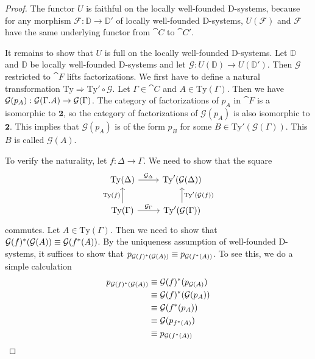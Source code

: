 \begin{proof}
The functor $U$ is faithful on the locally well-founded D-systems, because for any morphism 
$\mathcal{F}:\mathbb{D}\to\mathbb{D}'$ of locally well-founded D-systems, 
$U(\mathcal{F})$ and $\mathcal{F}$ have the same underlying functor
from $\cat{C}$ to $\cat{C}'$. 

It remains to show that $U$ is full on the locally well-founded D-systems. Let
$\mathbb{D}$ and $\mathbb{D}$ be locally well-founded D-systems and let $\mathcal{G}:U(\mathbb{D})
\to U(\mathbb{D}')$. Then $\mathcal{G}$ restricted to $\cat{F}$ lifts factorizations.
We  first have to define a natural transformation
$\mathrm{Ty}\Rightarrow \mathrm{Ty}'\circ\mathcal{G}$. Let
$\Gamma\in\cat{C}$ and $A\in\mathrm{Ty}(\Gamma)$. Then we have
$\mathcal{G}(p_A):\mathcal{G}(\ctxext{\Gamma}{A})\to \mathcal{G}(\Gamma)$.
The category of factorizations of $p_A$ in $\cat{F}$ is a isomorphic to $\mathbf{2}$,
so the category of factorizations of $\mathcal{G}(p_A)$ is also isomorphic to
$\mathbf{2}$. This implies that $\mathcal{G}(p_A)$ is of the form $p_B$ for
some $B\in\mathrm{Ty}'(\mathcal{G}(\Gamma))$. This $B$ is called $\mathcal{G}(A)$.

To verify the naturality, let $f:\Delta\to\Gamma$. We need to show that the
square
\begin{equation*}
\begin{tikzcd}
\mathrm{Ty}(\Delta) \arrow[r,"{\mathcal{G}_\Delta}"] & \mathrm{Ty}'(\mathcal{G}(\Delta)) \\
\mathrm{Ty}(\Gamma) \arrow[u,"\mathrm{Ty}(f)"] \arrow[r,"{\mathcal{G}_\Gamma}"] &
\mathrm{Ty}'(\mathcal{G}(\Gamma)) \arrow[u,swap,"{\mathrm{Ty}'(\mathcal{G}(f))}"]
\end{tikzcd}
\end{equation*}
commutes. Let $A\in\mathrm{Ty}(\Gamma)$. Then we need to show that
$\mathcal{G}(f)^\ast(\mathcal{G}(A))\equiv \mathcal{G}(f^\ast(A))$. By the uniqueness
assumption of well-founded D-systems, it suffices to show that
$p_{\mathcal{G}(f)^\ast(\mathcal{G}(A))}\equiv p_{\mathcal{G}(f^\ast(A))}$. To
see this, we do a simple calculation
\begin{align*}
p_{\mathcal{G}(f)^\ast(\mathcal{G}(A))}
& \equiv \mathcal{G}(f)^\ast(p_{\mathcal{G}(A)}) \\
& \equiv \mathcal{G}(f)^\ast(\mathcal{G}(p_A)) \\
& \equiv \mathcal{G}(f^\ast(p_A)) \\
& \equiv \mathcal{G}(p_{f^\ast(A)}) \\
& \equiv p_{\mathcal{G}(f^\ast(A))} \qedhere
\end{align*}
\end{proof}

